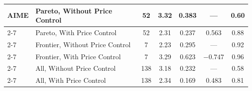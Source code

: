 \begin{table}[t]
\begin{tabular}{|l|l|c|c|c|c|c|}
AIME & Pareto, Without Price Control & 52 & 3.32 & 0.383 & --- & 0.60 \\ \cline{2-7}
\rowcolor{restrgray} \cellcolor{white} & Pareto, With Price Control & 52 & 2.31 & 0.237 & 0.563 & 0.88 \\ \cline{2-7}
\cellcolor{white} & Frontier, Without Price Control & 7 & 2.23 & 0.295 & --- & 0.92 \\ \cline{2-7}
\rowcolor{restrgray} \cellcolor{white} & Frontier, With Price Control & 7 & 3.29 & 0.623 & $-0.747$ & 0.96 \\ \cline{2-7}
\cellcolor{white} & All, Without Price Control & 138 & 3.18 & 0.232 & --- & 0.58 \\ \cline{2-7}
\rowcolor{restrgray} \cellcolor{white} & All, With Price Control & 138 & 2.34 & 0.169 & 0.483 & 0.81 \\
\hline

\end{tabular}
\end{table}
